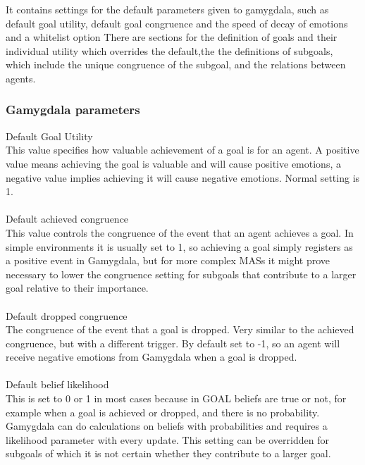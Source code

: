\documentclass[11pt]{article}
\begin{document}
It contains settings for the default parameters given to gamygdala, such as default goal utility, default goal congruence and the speed of decay of emotions and a whitelist option There are sections for the definition of goals and their individual utility which overrides the default,the the definitions of subgoals, which include the unique congruence of the subgoal, and the relations between agents.

\subsubsection{Gamygdala parameters}
Default Goal Utility\\
This value specifies how valuable achievement of a goal is for an agent. A positive value means achieving the goal is valuable and will cause positive emotions, a negative value implies achieving it will cause negative emotions. Normal setting is 1.\\
\\
Default achieved congruence\\
This value controls the congruence of the event that an agent achieves a goal. In simple environments it is usually set to 1, so achieving a goal simply registers as a positive event in Gamygdala, but for more complex MASs it might prove necessary to lower the congruence setting for subgoals that contribute to a larger goal relative to their importance.\\
\\
Default dropped congruence\\
The congruence of the event that a goal is dropped. Very similar to the achieved congruence, but with a different trigger. By default set to -1, so an agent will receive negative emotions from Gamygdala when a goal is dropped.\\
\\
Default belief likelihood\\
This is set to 0 or 1 in most cases because in GOAL beliefs are true or not, for example when a goal is achieved or dropped, and there is no probability. Gamygdala can do calculations on beliefs with probabilities and requires a likelihood parameter with every update. This setting can be overridden for subgoals of which it is not certain whether they contribute to a larger goal.\\
\\
\end{document}
